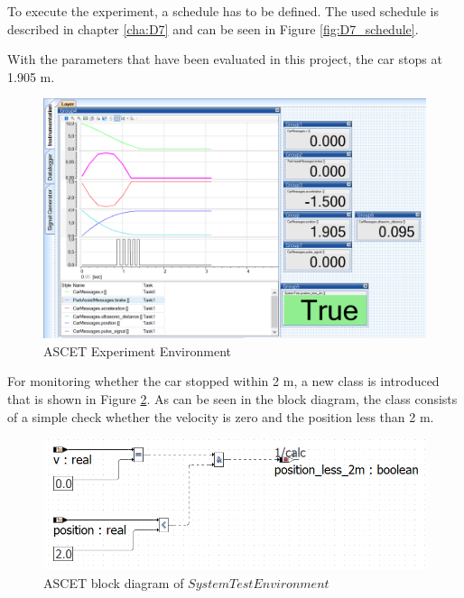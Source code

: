 To execute the experiment, a schedule has to be defined. The used schedule is described in chapter \ref{cha:D7} and can be seen in Figure \ref{fig:D7_schedule}.

With the parameters that have been evaluated in this project, the car stops at 1.905 m.

\begin{figure}[H]
\centering
\includegraphics[width=1\textwidth]{images/ascet_experiment_environment.png}
\caption{ASCET Experiment Environment}
\label{fig:D10}
\end{figure}

For monitoring whether the car stopped within 2 m, a new class is introduced that is shown in Figure \ref{fig:D10_systest}. As can be seen in the block diagram, the class consists of a simple check whether the velocity is zero and the position less than 2 m. 

\begin{figure}[H]
\centering
\includegraphics[width=1\textwidth]{images/Blockdiagramm_systemtest.png}
\caption{ASCET block diagram of $SystemTestEnvironment$}
\label{fig:D10_systest}
\end{figure}


